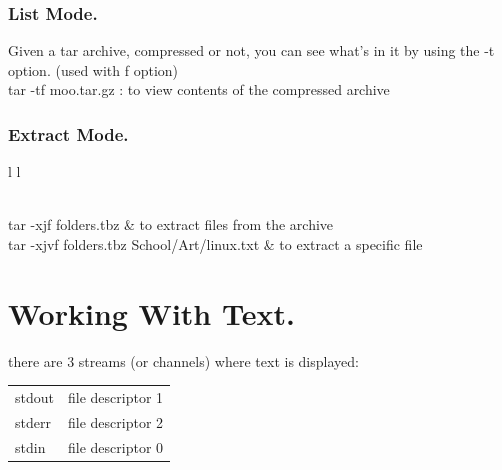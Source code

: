 \documentclass[10pt]{article}
\begin{document}
\subsubsection{List Mode.}
Given a tar archive, compressed or not, you can see what’s in it by using the -t option. (used with f option)\\
tar -tf  moo.tar.gz : to view contents of the compressed archive

\subsubsection{Extract Mode.}
\begin{center}
	\begin{tabular}{ l l }

		\\
		tar -xjf folders.tbz & to extract files from the archive\\
		tar -xjvf folders.tbz School/Art/linux.txt & to extract a specific file\\

	\end{tabular}
\end{center}


\section{Working With Text.}
there are 3 streams (or channels) where text is displayed:\\
\begin{center}
	\begin{tabular}{ l l }

		stdout &file descriptor 1\\
		stderr &file descriptor 2\\
		stdin  &file descriptor 0\\

	\end{tabular}
\end{center}
\end{document}
